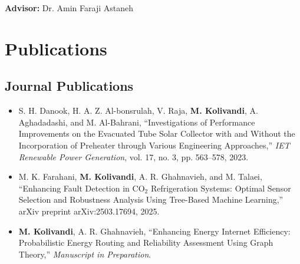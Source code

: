 \documentclass[letter,20pt]{article}
\begin{document}
\vspace{4pt}

\hspace{10pt}
\textbf{Advisor:}
Dr. Amin Faraji Astaneh



\section{\textbf{Publications}}

\vspace{5pt}


\subsection*{\fontsize{10pt}{12pt}\selectfont Journal Publications}


\begin{itemize}
[
noitemsep,
topsep=5pt,
leftmargin=3ex
]


\item
\justifying
S. H. Danook, H. A. Z. Al-bonsrulah, V. Raja, 
\textbf{M. Kolivandi}, A. Aghadadashi, and M. Al-Bahrani,
``Investigations of Performance Improvements on the Evacuated Tube Solar Collector with and Without the Incorporation of Preheater through Various Engineering Approaches,''
\textit{IET Renewable Power Generation},
vol. 17, no. 3, pp. 563--578, 2023.

\vspace{5pt}


\item
\justifying
M. K. Farahani,
\textbf{M. Kolivandi},
A. R. Ghahnavieh, and M. Talaei,
``Enhancing Fault Detection in CO$_2$ Refrigeration Systems: Optimal Sensor Selection and Robustness Analysis Using Tree-Based Machine Learning,''
arXiv preprint arXiv:2503.17694, 2025.


\vspace{5pt}


\item
\justifying
\textbf{M. Kolivandi},
A. R. Ghahnavieh,
``Enhancing Energy Internet Efficiency: Probabilistic Energy Routing and Reliability Assessment Using Graph Theory,''
\textit{Manuscript in Preparation}.


\end{itemize}
\end{document}
